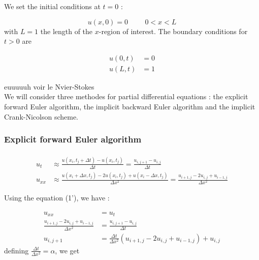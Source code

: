 \documentclass[a4paper, twoside, 11pt]{report}
\theoremstyle{theorem}
\theoremstyle{remark}
\theoremstyle{exemple}
\begin{document}
            We set the initial conditions at $t=0$ :

            \begin{equation*}
                u(x,0)=0 \hspace{1cm} 0<x<L
            \end{equation*}
            with $L=1$ the length of the $x$-region of interest.
        The boundary conditions for $t>0$ are

            \begin{align*}
                u(0,t)&=0\\
                u(L,t)&=1
            \end{align*}

        euuuuuh voir le Nvier-Stokes\\
        We will consider three methodes for partial differential equations : the explicit forward Euler algorithm, the implicit backward Euler algorithm and the implicit Crank-Nicolson scheme.

            \subsubsection{Explicit forward Euler algorithm}

                \paragraph{}

                    \begin{align*}
                        u_t &\approx \frac{u(x_i,t_j + \Delta t)-u(x_i,t_j)}{\Delta t} =                                                                 \frac{u_{i,j+1}-u_{i,j}}{\Delta t}\\
                        u_{xx} &\approx \frac{u(x_i + \Delta x,t_j)-2u(x_i,t_j)+u(x_i - \Delta x,t_j)}{\Delta x^2} = \frac{u_{i+1,j}-2u_{i,j}+u_{i-1,j}}{\Delta x^2}
                    \end{align*}

                    Using the equation (1'), we have :

                    \begin{align*}
                        u_{xx}&=u_t\\
                        \frac{u_{i+1,j}-2u_{i,j}+u_{i-1,j}}{\Delta x^2}&=\frac{u_{i,j+1}-u_{i,j}}{\Delta t}\\
                        u_{i,j+1}&=\frac{\Delta t}{\Delta x^2}(u_{i+1,j}-2u_{i,j}+u_{i-1,j})+u_{i,j}
                    \end{align*}
                    defining $\displaystyle \frac{\Delta t}{\Delta x^2}=\alpha$, we get
\end{document}
